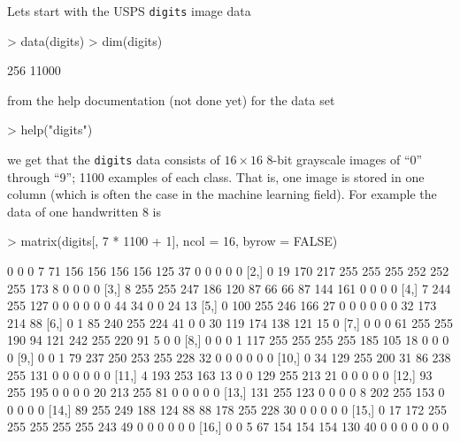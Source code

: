 \documentclass[12pt,oneside,titlepage,letter]{article}
\newcommand{\modify}[1]{{\color{blue}#1}}
\begin{document}
Lets start with the USPS \texttt{digits} image data
\begin{Schunk}
\begin{Sinput}
> data(digits)
> dim(digits)
\end{Sinput}
\begin{Soutput}
[1]   256 11000
\end{Soutput}
\end{Schunk}
from the help documentation (\modify{not done yet}) for the data set
\begin{Schunk}
\begin{Sinput}
> help("digits")
\end{Sinput}
\end{Schunk}
we get that the \texttt{digits} data consists of \modify{$16\times 16$ 8-bit grayscale images of ``0'' through ``9''; 1100 examples of each class}. That is, one image is stored in one column (which is often the case in the machine learning field). For example the data of one handwritten $8$ is 
\begin{Schunk}
\begin{Sinput}
> matrix(digits[, 7 * 1100 + 1], ncol = 16, byrow = FALSE)
\end{Sinput}
\end{Schunk}
\begin{tiny}
\begin{Schunk}
\begin{Soutput}
      [,1] [,2] [,3] [,4] [,5] [,6] [,7] [,8] [,9] [,10] [,11] [,12] [,13] [,14] [,15] [,16]
 [1,]    0    0    0    7   71  156  156  156  156   125    37     0     0     0     0     0
 [2,]    0   19  170  217  255  255  255  252  252   255   173     8     0     0     0     0
 [3,]    8  255  255  247  186  120   87   66   66    87   144   161     0     0     0     0
 [4,]    7  244  255  127    0    0    0    0    0     0    44    34     0     0    24    13
 [5,]    0  100  255  246  166   27    0    0    0     0     0     0    32   173   214    88
 [6,]    0    1   85  240  255  224   41    0    0    30   119   174   138   121    15     0
 [7,]    0    0    0   61  255  255  190   94  121   242   255   220    91     5     0     0
 [8,]    0    0    0    1  117  255  255  255  255   185   105    18     0     0     0     0
 [9,]    0    0    1   79  237  250  253  255  228    32     0     0     0     0     0     0
[10,]    0   34  129  255  200   31   86  238  255   131     0     0     0     0     0     0
[11,]    4  193  253  163   13    0    0  129  255   213    21     0     0     0     0     0
[12,]   93  255  195    0    0    0    0   20  213   255    81     0     0     0     0     0
[13,]  131  255  123    0    0    0    0    8  202   255   153     0     0     0     0     0
[14,]   89  255  249  188  124   88   88  178  255   228    30     0     0     0     0     0
[15,]    0   17  172  255  255  255  255  255  243    49     0     0     0     0     0     0
[16,]    0    0    5   67  154  154  154  130   40     0     0     0     0     0     0     0
\end{Soutput}
\end{Schunk}
\end{tiny}
\end{document}
